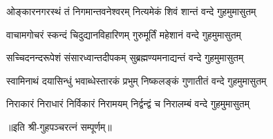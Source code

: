 
\twolineshloka
{ओङ्कारनगरस्थं तं निगमान्तवनेश्वरम्}
{नित्यमेकं शिवं शान्तं वन्दे गुहमुमासुतम्}

\twolineshloka
{वाचामगोचरं स्कन्दं चिदुद्यानविहारिणम्}
{गुरुमूर्तिं महेशानं वन्दे गुहमुमासुतम्}

\twolineshloka
{सच्चिदनन्दरूपेशं संसारध्वान्तदीपकम्}
{सुब्रह्मण्यमनाद्यन्तं वन्दे गुहमुमासुतम्}

\twolineshloka
{स्वामिनाथं दयासिन्धुं भवाब्धेस्तारकं प्रभुम्}
{निष्कलङ्कं गुणातीतं वन्दे गुहमुमासुतम्}

\twolineshloka
{निराकारं निराधारं निर्विकारं निरामयम्}
{निर्द्वन्द्वं च निरालम्बं वन्दे गुहमुमासुतम्}

॥इति श्री-गुहपञ्चरत्नं सम्पूर्णम्॥

